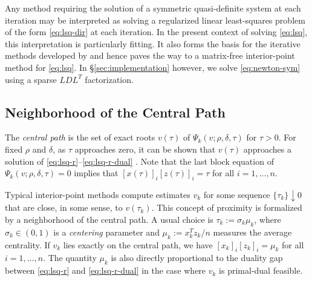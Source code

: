 \documentclass{amsart}
\begin{document}
Any method requiring the solution of a symmetric quasi-definite system at each
iteration may be interpreted as solving a regularized linear least-squares
problem of the form \eqref{eq:lsq-dir} at each iteration. In the present
context of solving \eqref{eq:lsq}, this interpretation is particularly fitting.
It also forms the basis for the iterative methods developed by
\cite{arioli-orban-2012} and hence paves the way to a matrix-free
interior-point method for \eqref{eq:lsq}. In \S\ref{sec:implementation}
however, we solve \eqref{eq:newton-sym} using a sparse $LDL^T$ factorization.

\subsection{Neighborhood of the Central Path}

The \textit{central path} is the set of exact roots $v(\tau)$ of
$\Psi_k(v;\rho,\delta,\tau)$ for $\tau > 0$. For fixed $\rho$ and $\delta$, as
$\tau$ approaches zero, it can be shown that $v(\tau)$ approaches a solution of
\eqref{eq:lsq-r}--\eqref{eq:lsq-r-dual} \citep{FiaccoMcCormick}.
Note that the last block equation of $\Psi_k(v;\rho,\delta,\tau) = 0$ implies
that $[x(\tau)]_i [z(\tau)]_i = \tau$ for all $i = 1, \ldots, n$.

Typical interior-point methods compute estimates $v_k$ for some sequence
$\{\tau_k\} \downarrow 0$ that are close, in some sense, to $v(\tau_k)$. This
concept of proximity is formalized by a neighborhood of the central path. A
usual choice is $\tau_k := \sigma_k \mu_k$, where $\sigma_k \in (0,1)$ is a
\textit{centering} parameter and $\mu_k := x_k^T z_k / n$ measures the
average centrality. If $v_k$ lies exactly on the central path, we have $[x_k]_i
[z_k]_i = \mu_k$ for all $i = 1, \ldots, n$. The quantity $\mu_k$ is also
directly proportional to the duality gap between \eqref{eq:lsq-r} and
\eqref{eq:lsq-r-dual} in the case where $v_k$ is primal-dual feasible.
\end{document}
